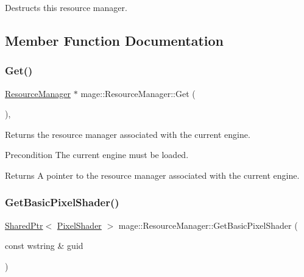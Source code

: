 Destructs this resource manager. 

\subsection{Member Function Documentation}
\hypertarget{classmage_1_1_resource_manager_a1e6ca77d892578fc4df0e62dfbc807f6}{}\label{classmage_1_1_resource_manager_a1e6ca77d892578fc4df0e62dfbc807f6} 
\subsubsection{\texorpdfstring{Get()}{Get()}}
{\footnotesize\ttfamily \hyperlink{classmage_1_1_resource_manager}{Resource\+Manager} $\ast$ mage\+::\+Resource\+Manager\+::\+Get (\begin{DoxyParamCaption}{ }\end{DoxyParamCaption})\hspace{0.3cm}{\ttfamily [static]}, {\ttfamily [noexcept]}}

Returns the resource manager associated with the current engine.

\begin{DoxyPrecond}{Precondition}
The current engine must be loaded. 
\end{DoxyPrecond}
\begin{DoxyReturn}{Returns}
A pointer to the resource manager associated with the current engine. 
\end{DoxyReturn}
\hypertarget{classmage_1_1_resource_manager_a68ad57f1d907c348540f94810e7b3fe0}{}\label{classmage_1_1_resource_manager_a68ad57f1d907c348540f94810e7b3fe0} 
\subsubsection{\texorpdfstring{Get\+Basic\+Pixel\+Shader()}{GetBasicPixelShader()}}
{\footnotesize\ttfamily \hyperlink{namespacemage_a1e01ae66713838a7a67d30e44c67703e}{Shared\+Ptr}$<$ \hyperlink{classmage_1_1_pixel_shader}{Pixel\+Shader} $>$ mage\+::\+Resource\+Manager\+::\+Get\+Basic\+Pixel\+Shader (\begin{DoxyParamCaption}\item[{const wstring \&}]{guid }\end{DoxyParamCaption})\hspace{0.3cm}{\ttfamily [noexcept]}}

